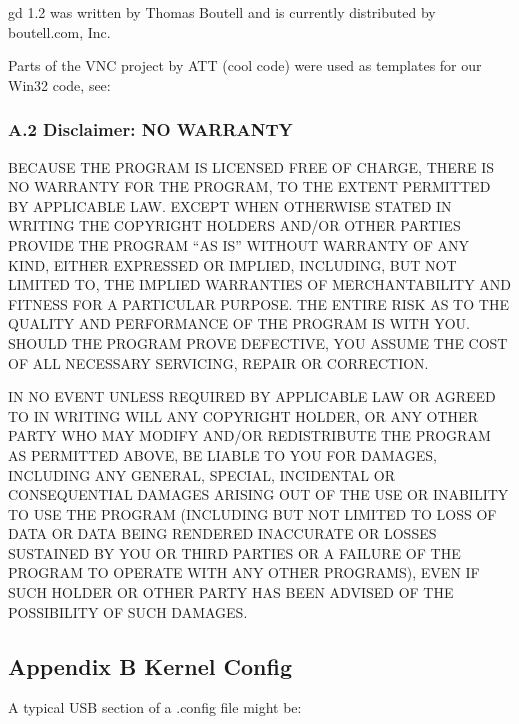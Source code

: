 {{{{{{{{{{{{{{{{{gd 1.2 was written by Thomas Boutell and is currently distributed by
boutell.com, Inc.  

Parts of the VNC project by ATT (cool code) were used as templates for our
Win32 code, see: 


\label{Disclaimer_003b-NO-WARRANTY}

\subsubsection*{A.2 Disclaimer: NO WARRANTY}

\label{index-Disclaimer-264}
BECAUSE THE PROGRAM IS LICENSED FREE OF CHARGE, THERE IS NO WARRANTY FOR THE
PROGRAM, TO THE EXTENT PERMITTED BY APPLICABLE LAW. EXCEPT WHEN OTHERWISE
STATED IN WRITING THE COPYRIGHT HOLDERS AND/OR OTHER PARTIES PROVIDE THE
PROGRAM ``AS IS'' WITHOUT WARRANTY OF ANY KIND, EITHER EXPRESSED OR IMPLIED,
INCLUDING, BUT NOT LIMITED TO, THE IMPLIED WARRANTIES OF MERCHANTABILITY AND
FITNESS FOR A PARTICULAR PURPOSE. THE ENTIRE RISK AS TO THE QUALITY AND
PERFORMANCE OF THE PROGRAM IS WITH YOU. SHOULD THE PROGRAM PROVE DEFECTIVE,
YOU ASSUME THE COST OF ALL NECESSARY SERVICING, REPAIR OR CORRECTION.  

IN NO EVENT UNLESS REQUIRED BY APPLICABLE LAW OR AGREED TO IN WRITING WILL ANY
COPYRIGHT HOLDER, OR ANY OTHER PARTY WHO MAY MODIFY AND/OR REDISTRIBUTE THE
PROGRAM AS PERMITTED ABOVE, BE LIABLE TO YOU FOR DAMAGES, INCLUDING ANY
GENERAL, SPECIAL, INCIDENTAL OR CONSEQUENTIAL DAMAGES ARISING OUT OF THE USE
OR INABILITY TO USE THE PROGRAM (INCLUDING BUT NOT LIMITED TO LOSS OF DATA OR
DATA BEING RENDERED INACCURATE OR LOSSES SUSTAINED BY YOU OR THIRD PARTIES OR
A FAILURE OF THE PROGRAM TO OPERATE WITH ANY OTHER PROGRAMS), EVEN IF SUCH
HOLDER OR OTHER PARTY HAS BEEN ADVISED OF THE POSSIBILITY OF SUCH DAMAGES. 

\label{Kernel-Config}

\subsection*{Appendix B Kernel Config}

A typical USB section of a .config file might be:  

}}}}}}}}}}}}}}}}}
